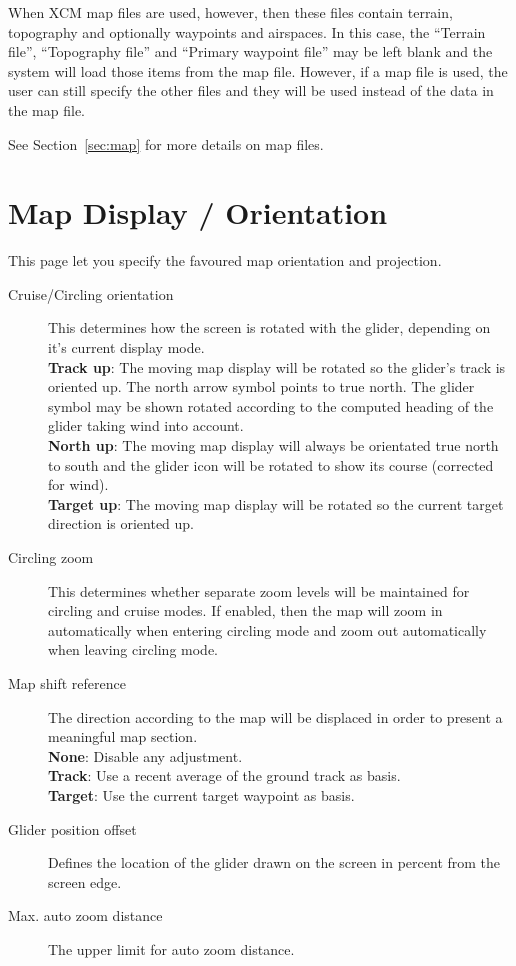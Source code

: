When XCM map files are used, however, then these files contain terrain, topography
and optionally waypoints and airspaces.  In this case, the ``Terrain file'', ``Topography file'' and 
``Primary waypoint file'' may be left blank and the system will load those items
from the map file. However, if a map file is used, the user can still specify the other
files and they will be used instead of the data in the map file.

See Section~\ref{sec:map} for more details on map files.


\section{Map Display / Orientation}\label{sec:map-projection}

This page let you specify the favoured map orientation and projection.

\begin{description}
\item[Cruise/Circling orientation]  \label{conf:orientation} This determines how
  the screen is rotated with the glider, depending on it's current display mode. \\
  {\bf Track up}: The moving map display will be rotated so the glider's track
  is oriented up. The north arrow symbol points to true north. The glider symbol 
  may be shown rotated according to the computed heading of the glider taking 
  wind into account. \\
  {\bf North up}: The moving map display will always be orientated true north to
  south and the glider icon will be rotated to show its course (corrected for
  wind). \\
  {\bf Target up}: The moving map display will be rotated so the current target
  direction is oriented up.
\item[Circling zoom]  \label{conf:circlingzoom} This determines whether separate
  zoom levels will be maintained for circling and cruise modes.  If enabled, then the 
  map will zoom in automatically when entering circling mode and zoom out
  automatically when leaving circling mode.
\item[Map shift reference]  The direction according to the map will be displaced 
  in order to present a meaningful map section. \\
  {\bf None}: Disable any adjustment. \\
  {\bf Track}: Use a recent average of the ground track as basis. \\
  {\bf Target}: Use the current target waypoint as basis.
\item[Glider position offset]  \label{conf:gliderposition} Defines the location of the 
  glider drawn on the screen in percent from the screen edge.
\item[Max. auto zoom distance]  The upper limit for auto zoom distance.
\end{description}


